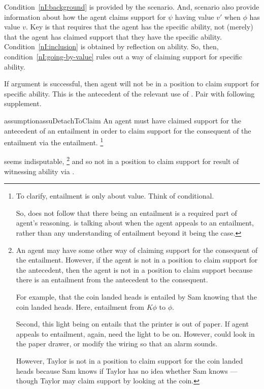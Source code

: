 \newpage

\begin{note}
  Condition~\ref{nI:background} is provided by the scenario.
  And, scenario also provide information about how the agent claims support for \(\psi\) having value \(v'\) when \(\phi\) has value \(v\).
  Key is that  requires that the agent has the specific ability, not (merely) that the agent has claimed support that they have the specific ability.
  Condition~\ref{nI:inclusion} is obtained by reflection on ability.
  So, then, condition~\ref{nI:going-by-value} rules out a way of claiming support for specific ability.
\end{note}

\begin{note}
  If argument is successful, then agent will not be in a position to claim support for specific ability.
  This is the antecedent of the relevant use of .
  Pair \nI{} with following supplement.

  \begin{restatable}[]{assumption}{assuDetachToClaim}\label{assu:detach-to-claim}
    An agent must have claimed support for the antecedent of an entailment in order to claim support for the consequent of the entailment via the entailment.\nolinebreak
    \footnote{To clarify, entailment is only about value.
      Think of conditional.

      So, does not follow that there being an entailment is a required part of agent's reasoning.
      \nIm{} is talking about when the agent appeals to an entailment, rather than any understanding of entailment beyond it being the case.
    }
  \end{restatable}
  \nIm{} seems indisputable,\nolinebreak
  \footnote{
    An agent may have some other way of claiming support for the consequent of the entailment.
    However, if the agent is not in a position to claim support for the antecedent, then the agent is not in a position to claim support because there is an entailment from the antecedent to the consequent.\nolinebreak

    For example, that the coin landed heads is entailed by Sam knowing that the coin landed heads.
    Here, entailment from \(K\phi\) to \(\phi\).

    Second, this light being on entails that the printer is out of paper.
    If agent appeals to entailment, again, need the light to be on.
    However, could look in the paper drawer, or modify the wiring so that an alarm sounds.

    However, Taylor is not in a position to claim support for the coin landed heads because Sam knows if Taylor has no idea whether Sam knows --- though Taylor may claim support by looking at the coin.
  }
  and so not in a position to claim support for result of witnessing ability via \AR{}.
\end{note}


